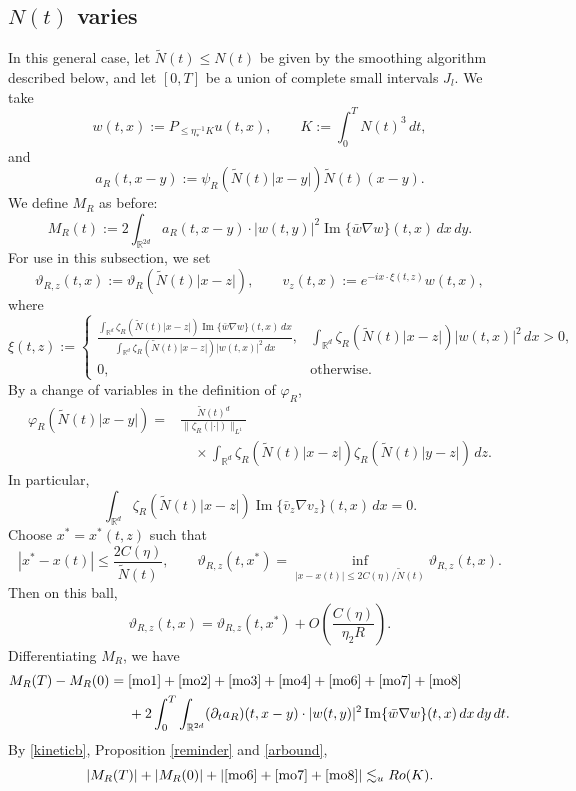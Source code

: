 \documentclass[reqno,11pt]{amsart}
\theoremstyle{plain}
\theoremstyle{definition}
\numberwithin{equation}{section}
\numberwithin{theorem}{section}
\def\leq{\leqslant}
\def\R{\mathbb{R}}
\begin{document}
\subsection{$N(t)$ varies}
In this general case, let $\tilde N(t)\leq N(t)$ be given by the smoothing
algorithm described below, and let $[0,T]$ be a union of complete small
intervals $J_l$. We take
\[
 w(t,x):=P_{\leq\eta_{\ast}^{-1}K}u(t,x),\qquad
 K:=\int_0^TN(t)^3\,dt,
\]
and
\[
 a_R(t,x-y):=\psi_R(\tilde N(t)|x-y|)\tilde N(t)(x-y).
\]
We define $M_R$ as before:
\[
 M_R(t):=2\int_{\R^{2d}}a_R(t,x-y)\cdot|w(t,y)|^2
                  \operatorname{Im}\{\bar w\nabla w\}(t,x)\,dx\,dy.
\]
For use in this subsection, we set
\[
 \vartheta_{R,z}(t,x):=\vartheta_R(\tilde N(t)|x-z|),\qquad
 v_z(t,x):=e^{-ix\cdot\xi(t,z)}w(t,x),
\]
where
\[
 \xi(t,z):=
 \begin{cases}
 \displaystyle\frac{\int_{\R^d}\zeta_R(\tilde N(t)|x-z|)
                  \operatorname{Im}\{\bar w\nabla w\}(t,x)\,dx}
                  {\int_{\R^d}\zeta_R(\tilde N(t)|x-z|)|w(t,x)|^2\,dx},
       &\displaystyle\int_{\R^d}\zeta_R(\tilde N(t)|x-z|)|w(t,x)|^2\,dx>0,\\
 0, &\text{otherwise}.
 \end{cases}
\]
By a change of variables in the definition of $\varphi_R$,
\begin{align*}
 \varphi_R(\tilde N(t)|x-y|)
 ={}&\frac{\tilde N(t)^d}{\|\zeta_R(|\cdot|)\|_{L^1}}\\
 &\quad\times\int_{\R^d}\zeta_R(\tilde N(t)|x-z|)
                          \zeta_R(\tilde N(t)|y-z|)\,dz.
\end{align*}
In particular,
\[
 \int_{\R^d}\zeta_R(\tilde N(t)|x-z|)
             \operatorname{Im}\{\bar v_z\nabla v_z\}(t,x)\,dx=0.
\]
Choose $x^{\ast}=x^{\ast}(t,z)$ such that
\[
 |x^{\ast}-x(t)|\leq\frac{2C(\eta)}{\tilde N(t)},\qquad
 \vartheta_{R,z}(t,x^{\ast})
 =\inf_{|x-x(t)|\leq2C(\eta)/\tilde N(t)}\vartheta_{R,z}(t,x).
\]
Then on this ball,
\[
 \vartheta_{R,z}(t,x)=\vartheta_{R,z}(t,x^{\ast})
                      +O\left(\frac{C(\eta)}{\eta_2R}\right).
\]
Differentiating $M_R$, we have
\begin{align}
 M_R(T)-M_R(0)
 ={}&\eqref{mo1}+\eqref{mo2}+\eqref{mo3}+\eqref{mo4}
       +\eqref{mo6}+\eqref{mo7}+\eqref{mo8}\label{mo50}\\
 &+2\int_0^T\int_{\R^{2d}}(\partial_ta_R)(t,x-y)\cdot|w(t,y)|^2
       \operatorname{Im}\{\bar w\nabla w\}(t,x)\,dx\,dy\,dt.\label{mo5}
\end{align}
By \eqref{kineticb}, Proposition \ref{reminder} and \eqref{arbound},
\begin{equation}\label{finala0}
 |M_R(T)|+|M_R(0)|+|\eqref{mo6}+\eqref{mo7}+\eqref{mo8}|
 \lesssim_u Ro(K).
\end{equation}
\end{document}
